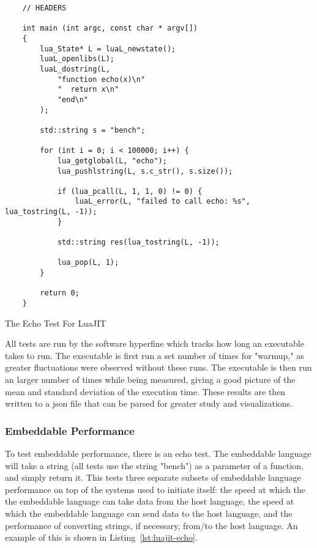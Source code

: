 \begin{listing}[H]
    \begin{verbatim}
    // HEADERS

    int main (int argc, const char * argv[])
    {
        lua_State* L = luaL_newstate();
        luaL_openlibs(L);
        luaL_dostring(L, 
            "function echo(x)\n"
            "  return x\n"
            "end\n"
        );

        std::string s = "bench";

        for (int i = 0; i < 100000; i++) {
            lua_getglobal(L, "echo");
            lua_pushlstring(L, s.c_str(), s.size());

            if (lua_pcall(L, 1, 1, 0) != 0) {
                luaL_error(L, "failed to call echo: %s", lua_tostring(L, -1));
            }

            std::string res(lua_tostring(L, -1));

            lua_pop(L, 1);
        }

        return 0;
    }
    \end{verbatim}
    \caption{The Echo Test For LuaJIT}
    \label{lst:luajit-echo}
\end{listing}

All tests are run by the software hyperfine\cite{hyperfine} which tracks how long an executable takes to run. The executable is first run a set number of times for "warmup," as greater fluctuations were observed without these runs. The executable is then run an larger number of times while being measured, giving a good picture of the mean and standard deviation of the execution time. These results are then written to a json file that can be parsed for greater study and visualizations.

\subsubsection{Embeddable Performance}
To test embeddable performance, there is an echo test. The embeddable language will take a string (all tests use the string "bench") as a parameter of a function, and simply return it. This tests three separate subsets of embeddable language performance on top of the systems used to initiate itself: the speed at which the the embeddable language can take data from the host language, the speed at which the embeddable language can send data to the host language, and the performance of converting strings, if necessary, from/to the host language. An example of this is shown in Listing~\ref{lst:luajit-echo}.

